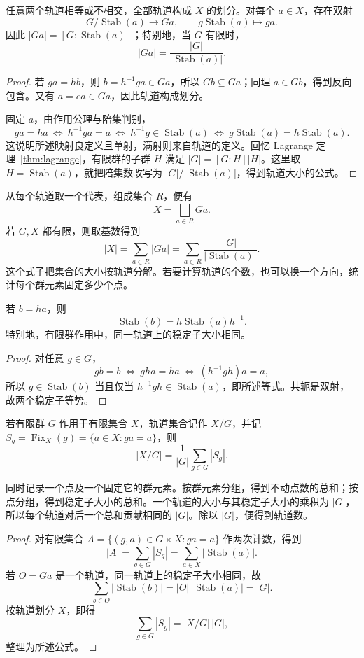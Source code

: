 \documentclass[lang=cn,a4paper,fontset=none,zihao=false,10pt,openany,twoside]{beautybook}
\numberwithin{algorithm}{chapter}
\begin{document}
\begin{proposition}\label{prop:orbit-stabilizer}
任意两个轨道相等或不相交，全部轨道构成 $X$ 的划分。对每个 $a\in X$，存在双射
\[
 G/\operatorname{Stab}(a)\longrightarrow Ga,
 \qquad g\operatorname{Stab}(a)\longmapsto ga.
\]
因此 $|Ga|=[G:\operatorname{Stab}(a)]$；特别地，当 $G$ 有限时，
\[
 |Ga|=\frac{|G|}{|\operatorname{Stab}(a)|}.
\]
\end{proposition}
\begin{proof}
若 $ga=hb$，则 $b=h^{-1}ga\in Ga$，所以 $Gb\subseteq Ga$；同理 $a\in Gb$，得到反向包含。又有 $a=ea\in Ga$，因此轨道构成划分。

固定 $a$，由作用公理与陪集判别，
\[
 ga=ha
 \ \Longleftrightarrow\ h^{-1}ga=a
 \ \Longleftrightarrow\ h^{-1}g\in\operatorname{Stab}(a)
 \ \Longleftrightarrow\ g\operatorname{Stab}(a)=h\operatorname{Stab}(a).
\]
这说明所述映射良定义且单射，满射则来自轨道的定义。回忆 Lagrange 定理~\ref{thm:lagrange}，有限群的子群 $H$ 满足 $|G|=[G:H]|H|$。这里取 $H=\operatorname{Stab}(a)$，就把陪集数改写为 $|G|/|\operatorname{Stab}(a)|$，得到轨道大小的公式。
\end{proof}
从每个轨道取一个代表，组成集合 $R$，便有
\[
 X=\bigsqcup_{a\in R}Ga.
\]
若 $G,X$ 都有限，则取基数得到
\[
 |X|=\sum_{a\in R}|Ga|
 =\sum_{a\in R}\frac{|G|}{|\operatorname{Stab}(a)|}.
\]
这个式子把集合的大小按轨道分解。若要计算轨道的个数，也可以换一个方向，统计每个群元素固定多少个点。

\begin{lemma}[同一轨道上的稳定子]
若 $b=ha$，则
\[
 \operatorname{Stab}(b)=h\operatorname{Stab}(a)h^{-1}.
\]
特别地，有限群作用中，同一轨道上的稳定子大小相同。
\end{lemma}
\begin{proof}
对任意 $g\in G$，
\[
 gb=b\ \Longleftrightarrow\ gha=ha
 \ \Longleftrightarrow\ (h^{-1}gh)a=a,
\]
所以 $g\in\operatorname{Stab}(b)$ 当且仅当 $h^{-1}gh\in\operatorname{Stab}(a)$，即所述等式。共轭是双射，故两个稳定子等势。
\end{proof}
\begin{theorem}\label{thm:burnside-counting}
若有限群 $G$ 作用于有限集合 $X$，轨道集合记作 $X/G$，并记 $S_g=\operatorname{Fix}_X(g)=\{a\in X:ga=a\}$，则
\[
 |X/G|=\frac1{|G|}\sum_{g\in G}|S_g|.
\]
\end{theorem}
\begin{remark}[按群元素与按轨道计数]
同时记录一个点及一个固定它的群元素。按群元素分组，得到不动点数的总和；按点分组，得到稳定子大小的总和。一个轨道的大小与其稳定子大小的乘积为 $|G|$，所以每个轨道对后一个总和贡献相同的 $|G|$。除以 $|G|$，便得到轨道数。
\end{remark}
\begin{proof}
对有限集合 $A=\{(g,a)\in G\times X:ga=a\}$ 作两次计数，得到
\[
 |A|=\sum_{g\in G}|S_g|
 =\sum_{a\in X}|\operatorname{Stab}(a)|.
\]
若 $O=Ga$ 是一个轨道，同一轨道上的稳定子大小相同，故
\[
 \sum_{b\in O}|\operatorname{Stab}(b)|
 =|O|\,|\operatorname{Stab}(a)|=|G|.
\]
按轨道划分 $X$，即得
\[
 \sum_{g\in G}|S_g|=|X/G|\,|G|,
\]
整理为所述公式。
\end{proof}
\end{document}
